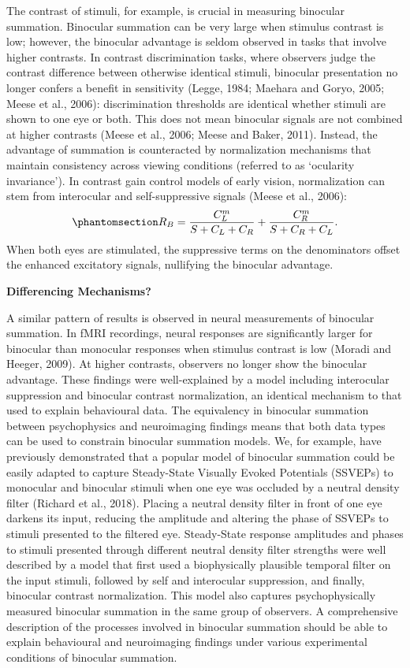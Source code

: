 \documentclass[
  12pt,
]{article}
\begin{document}
The contrast of stimuli, for example, is crucial in measuring binocular
summation. Binocular summation can be very large when stimulus contrast
is low; however, the binocular advantage is seldom observed in tasks
that involve higher contrasts. In contrast discrimination tasks, where
observers judge the contrast difference between otherwise identical
stimuli, binocular presentation no longer confers a benefit in
sensitivity (Legge, 1984; Maehara and Goryo, 2005; Meese et al., 2006):
discrimination thresholds are identical whether stimuli are shown to one
eye or both. This does not mean binocular signals are not combined at
higher contrasts (Meese et al., 2006; Meese and Baker, 2011). Instead,
the advantage of summation is counteracted by normalization mechanisms
that maintain consistency across viewing conditions (referred to as
`ocularity invariance'). In contrast gain control models of early
vision, normalization can stem from interocular and self-suppressive
signals (Meese et al., 2006):
\begin{equation}\phantomsection\label{eq-intoMath2}{
R_B = \frac{C_L^m}{S+C_L+C_R} + \frac{C_R^m}{S+C_R+C_L}.
}\end{equation} When both eyes are stimulated, the suppressive terms on
the denominators offset the enhanced excitatory signals, nullifying the
binocular advantage.

\textbf{Differencing Mechanisms?}

A similar pattern of results is observed in neural measurements of
binocular summation. In fMRI recordings, neural responses are
significantly larger for binocular than monocular responses when
stimulus contrast is low (Moradi and Heeger, 2009). At higher contrasts,
observers no longer show the binocular advantage. These findings were
well-explained by a model including interocular suppression and
binocular contrast normalization, an identical mechanism to that used to
explain behavioural data. The equivalency in binocular summation between
psychophysics and neuroimaging findings means that both data types can
be used to constrain binocular summation models. We, for example, have
previously demonstrated that a popular model of binocular summation
could be easily adapted to capture Steady-State Visually Evoked
Potentials (SSVEPs) to monocular and binocular stimuli when one eye was
occluded by a neutral density filter (Richard et al., 2018). Placing a
neutral density filter in front of one eye darkens its input, reducing
the amplitude and altering the phase of SSVEPs to stimuli presented to
the filtered eye. Steady-State response amplitudes and phases to stimuli
presented through different neutral density filter strengths were well
described by a model that first used a biophysically plausible temporal
filter on the input stimuli, followed by self and interocular
suppression, and finally, binocular contrast normalization. This model
also captures psychophysically measured binocular summation in the same
group of observers. A comprehensive description of the processes
involved in binocular summation should be able to explain behavioural
and neuroimaging findings under various experimental conditions of
binocular summation.
\end{document}
